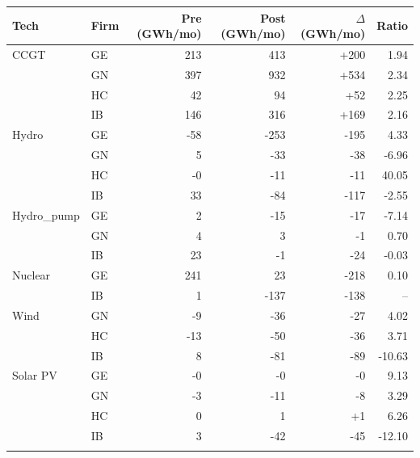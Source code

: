 \begin{tabular}{l l r r r r}
\toprule
Tech & Firm & Pre (GWh/mo) & Post (GWh/mo) & $\Delta$ (GWh/mo) & Ratio \\
\midrule
CCGT & GE & 213 & 413 & +200 & 1.94 \\
 & GN & 397 & 932 & +534 & 2.34 \\
 & HC & 42 & 94 & +52 & 2.25 \\
 & IB & 146 & 316 & +169 & 2.16 \\
\addlinespace
Hydro & GE & -58 & -253 & -195 & 4.33 \\
 & GN & 5 & -33 & -38 & -6.96 \\
 & HC & -0 & -11 & -11 & 40.05 \\
 & IB & 33 & -84 & -117 & -2.55 \\
\addlinespace
Hydro\_pump & GE & 2 & -15 & -17 & -7.14 \\
 & GN & 4 & 3 & -1 & 0.70 \\
 & IB & 23 & -1 & -24 & -0.03 \\
\addlinespace
Nuclear & GE & 241 & 23 & -218 & 0.10 \\
 & IB & 1 & -137 & -138 & -- \\
\addlinespace
Wind & GN & -9 & -36 & -27 & 4.02 \\
 & HC & -13 & -50 & -36 & 3.71 \\
 & IB & 8 & -81 & -89 & -10.63 \\
\addlinespace
Solar PV & GE & -0 & -0 & -0 & 9.13 \\
 & GN & -3 & -11 & -8 & 3.29 \\
 & HC & 0 & 1 & +1 & 6.26 \\
 & IB & 3 & -42 & -45 & -12.10 \\
\addlinespace
\bottomrule
\end{tabular}